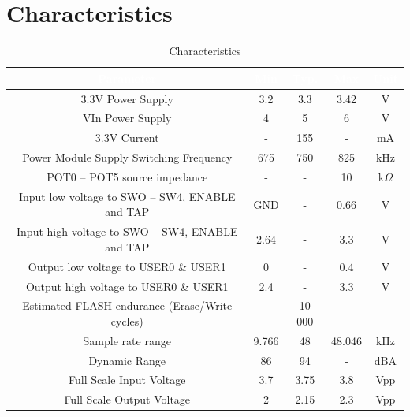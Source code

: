 \documentclass[a4paper, 10pt]{article}
\begin{document}
\section{Characteristics}
\bigbreak
\begin{table}[h!]
\centering
\begin{tabular}{|c|c|c|c|c|}
\hline
\rowcolor{gray}\textcolor{white}{\Large\textbf{Parameter}} & \textcolor{white}{\Large\textbf{Min}} &  \textcolor{white}{\Large\textbf{Typ.}} & \textcolor{white}{\Large\textbf{Max}} & \textcolor{white}{\Large\textbf{Unit}}\\
\hline
3.3V Power Supply & 3.2 & 3.3 & 3.42 & V\\
\hline
VIn Power Supply & 4 & 5 & 6 & V\\
\hline
3.3V Current & - & 155 & - & mA\\
\hline
Power Module Supply Switching Frequency & 675 & 750 & 825 & kHz\\
\hline
POT0 – POT5 source impedance & - & - & 10 & k$\Omega$\\
\hline
Input low voltage to SWO – SW4, ENABLE and TAP & GND & - & 0.66 & V\\
\hline
Input high voltage to SWO – SW4, ENABLE and TAP & 2.64 & - & 3.3 & V\\
\hline
Output low voltage to USER0 \& USER1 & 0 & - & 0.4 & V\\
\hline
Output high voltage to USER0 \& USER1 & 2.4 & - & 3.3 & V\\
\hline
Estimated FLASH endurance (Erase/Write cycles) & - & 10 000 & - & -\\
\hline
Sample rate range & 9.766 & 48 & 48.046 & kHz\\
\hline
Dynamic Range & 86 & 94 & - & dBA\\
\hline
Full Scale Input Voltage & 3.7 & 3.75 & 3.8 & Vpp\\
\hline
Full Scale Output Voltage & 2 & 2.15 & 2.3 & Vpp\\
\hline
\end{tabular}
\caption{Characteristics}
\end{table}
\end{document}
